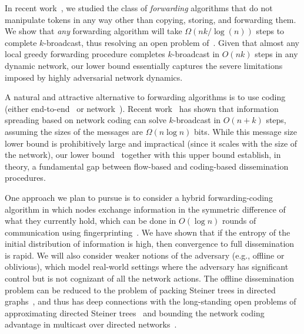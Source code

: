 
In recent work~\cite{dutta+prs:dynamic}, we studied the class of {\em
  forwarding}\/ algorithms that do not manipulate tokens in any way
other than copying, storing, and forwarding them.  We show that {\em
  any}\/ forwarding algorithm will take $\Omega(nk/\log(n))$ steps to
complete $k$-broadcast, thus resolving an open problem
of~\cite{kuhn+lo:dynamic}.  Given that almost any local greedy
forwarding procedure completes $k$-broadcast in $O(nk)$ steps in any
dynamic network, our lower bound essentially captures the severe
limitations imposed by highly adversarial network dynamics.

A natural and attractive alternative to forwarding algorithms is to
use coding (either end-to-end~\cite{Byers02adigital,Shok06} or
network~\cite{ahlswede+cly:coding}).  Recent
work~\cite{haeupler:gossip,haeupler+k:dynamic} has shown that
information spreading based on network coding can solve $k$-broadcast
in $O(n+k)$ steps, assuming the sizes of the messages are $\Omega(n
\log n)$ bits.  While this message size lower bound is prohibitively
large and impractical (since it scales with the size of the network),
our lower bound~\cite{dutta+prs:dynamic} together with this upper
bound establish, in theory, a fundamental gap between flow-based and
coding-based dissemination procedures.

One approach we plan to pursue is to consider a hybrid
forwarding-coding algorithm in which nodes exchange information in the
symmetric difference of what they currently hold, which can be done in
$O(\log n)$ rounds of communication using
fingerprinting~\cite{mitzenmacher-2005-fastmixing}.  We have shown
that if the entropy of the initial distribution of information
is high, then convergence to full dissemination is rapid.  We will
also consider weaker notions of the adversary (e.g., offline or
oblivious), which model real-world settings where the adversary has
significant control but is not cognizant of all the network actions.
The offline dissemination problem can be reduced to the problem of
packing Steiner trees in directed
graphs~\cite{cheriyan+s:steiner,dutta+prs:dynamic}, and thus has deep
connections with the long-standing open problems of approximating
directed Steiner
trees~\cite{charikar+ccdgg:steiner,halperin+k:steiner,zosin+k:steiner}
and bounding the network coding advantage in multicast over directed
networks~\cite{agarwal+c:coding,sanders+et:flow}.

